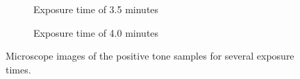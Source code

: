 \begin{figure}[htb]
\begin{subfigure}[t]{0.32\linewidth}
  	\caption{Exposure time of 3.5 minutes}
  	\label{fig:b3c1}
 \end{subfigure}
\hfill
     \begin{subfigure}[t]{0.32\linewidth}
  	\caption{Exposure time of 4.0 minutes}
  	\label{fig:b3f1}
 \end{subfigure}
\caption{Microscope images of the positive tone samples for several exposure times.}
\end{figure}




